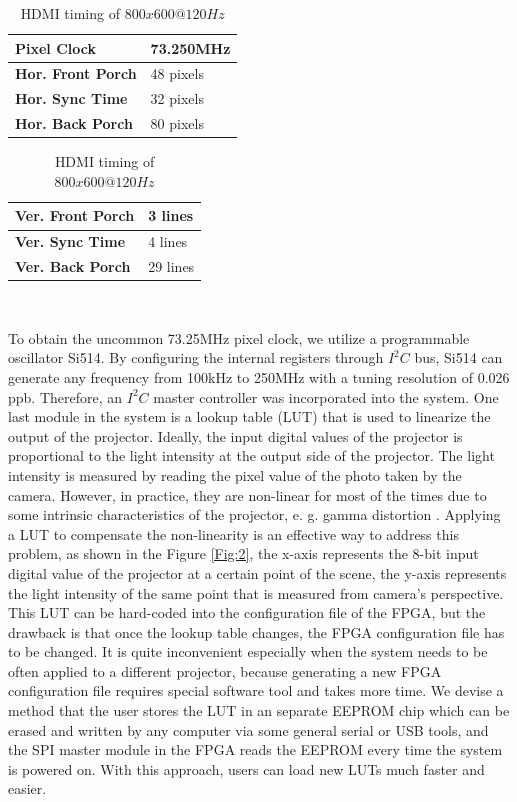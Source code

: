\documentclass[]{spie}  %
\begin{document}
\begin{table}[!htb]
\parbox{.45\linewidth}{
\centering
\begin{tabular}{|l|l|}
\hline
\textbf{Pixel Clock} & 73.250MHz \\ \hline
\textbf{Hor. Front Porch} & 48 pixels \\ \hline
\textbf{Hor. Sync Time} & 32 pixels \\ \hline
\textbf{Hor. Back Porch} & 80 pixels \\ \hline
\end{tabular}
}
\hfill
\parbox{.45\linewidth}{
\centering
\begin{tabular}{|l|l|}
\hline
\textbf{Ver. Front Porch} & 3 lines \\ \hline
\textbf{Ver. Sync Time} & 4 lines \\ \hline
\textbf{Ver. Back Porch} & 29 lines \\ \hline
\end{tabular}
}\\
\caption{HDMI timing of $800x600 @ 120 Hz$}
\label{Tab:2}
\end{table}

To obtain the uncommon 73.25MHz pixel clock, we utilize a programmable oscillator Si514. By configuring the internal registers through $I^2C$ bus, Si514 can generate any frequency from 100kHz to 250MHz with a tuning resolution of 0.026 ppb. Therefore, an $I^2C$ master controller was incorporated into the system. One last module in the system is a lookup table (LUT) that is used to linearize the output of the projector. Ideally, the input digital values of the projector is proportional to the light intensity at the output side of the projector. The light intensity is measured by reading the pixel value of the photo taken by the camera. However, in practice, they are non-linear for most of the times due to some intrinsic characteristics of the projector, e. g. gamma distortion \cite{gamm10}. Applying a LUT to compensate the non-linearity is an effective way to address this problem, as shown in the Figure \ref{Fig:2}, the x-axis represents the 8-bit input digital value of the projector at a certain point of the scene, the y-axis represents the light intensity of the same point that is measured from camera's perspective.
 This LUT can be hard-coded into the configuration file of the FPGA, but the drawback is that once the lookup table changes, the FPGA configuration file has to be changed. It is quite inconvenient especially when the system needs to be often applied to a different projector, because generating a new FPGA configuration file requires special software tool and takes more time. We devise a method that the user stores the LUT in an separate EEPROM chip which can be erased and written by any computer via some general serial or USB tools, and the SPI master module in the FPGA reads the EEPROM every time the system  is powered on. With this approach, users can load new LUTs much faster and easier.
\end{document}
